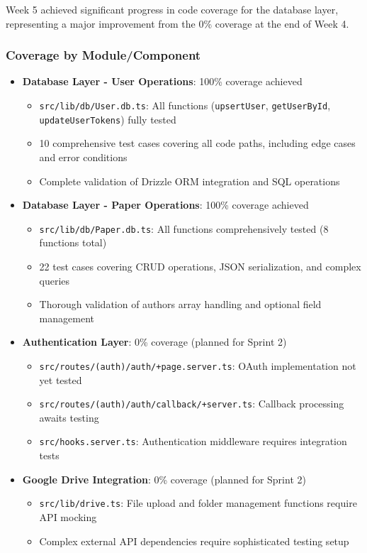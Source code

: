 \documentclass[12pt]{article}
\begin{document}
Week 5 achieved significant progress in code coverage for the database layer, representing a major improvement from the 0\% coverage at the end of Week 4.

\subsubsection{Coverage by Module/Component}
\begin{itemize}
  \item \textbf{Database Layer - User Operations}: 100\% coverage achieved
    \begin{itemize}
      \item \texttt{src/lib/db/User.db.ts}: All functions (\texttt{upsertUser}, \texttt{getUserById}, \texttt{updateUserTokens}) fully tested
      \item 10 comprehensive test cases covering all code paths, including edge cases and error conditions
      \item Complete validation of Drizzle ORM integration and SQL operations
    \end{itemize}
  
  \item \textbf{Database Layer - Paper Operations}: 100\% coverage achieved
    \begin{itemize}
      \item \texttt{src/lib/db/Paper.db.ts}: All functions comprehensively tested (8 functions total)
      \item 22 test cases covering CRUD operations, JSON serialization, and complex queries
      \item Thorough validation of authors array handling and optional field management
    \end{itemize}
  
  \item \textbf{Authentication Layer}: 0\% coverage (planned for Sprint 2)
    \begin{itemize}
      \item \texttt{src/routes/(auth)/auth/+page.server.ts}: OAuth implementation not yet tested
      \item \texttt{src/routes/(auth)/auth/callback/+server.ts}: Callback processing awaits testing
      \item \texttt{src/hooks.server.ts}: Authentication middleware requires integration tests
    \end{itemize}
  
  \item \textbf{Google Drive Integration}: 0\% coverage (planned for Sprint 2)
    \begin{itemize}
      \item \texttt{src/lib/drive.ts}: File upload and folder management functions require API mocking
      \item Complex external API dependencies require sophisticated testing setup
    \end{itemize}
  

\end{itemize}
\end{document}
